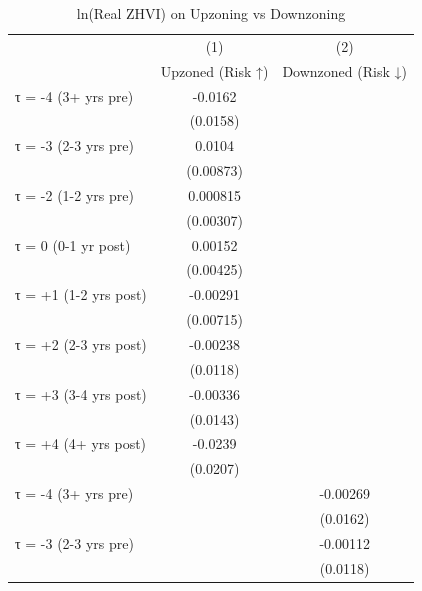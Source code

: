 \begin{table}[htbp]\centering
\def\sym#1{\ifmmode^{#1}\else\(^{#1}\)\fi}
\caption{ln(Real ZHVI) on Upzoning vs Downzoning}
\begin{tabular}{l*{2}{c}}
\hline\hline
                    &\multicolumn{1}{c}{(1)}&\multicolumn{1}{c}{(2)}\\
                    &\multicolumn{1}{c}{Upzoned (Risk ↑)}&\multicolumn{1}{c}{Downzoned (Risk ↓)}\\
\hline
τ = -4 (3+ yrs pre) &     -0.0162         &                     \\
                    &    (0.0158)         &                     \\
[1em]
τ = -3 (2-3 yrs pre)&      0.0104         &                     \\
                    &   (0.00873)         &                     \\
[1em]
τ = -2 (1-2 yrs pre)&    0.000815         &                     \\
                    &   (0.00307)         &                     \\
[1em]
τ = 0 (0-1 yr post) &     0.00152         &                     \\
                    &   (0.00425)         &                     \\
[1em]
τ = +1 (1-2 yrs post)&    -0.00291         &                     \\
                    &   (0.00715)         &                     \\
[1em]
τ = +2 (2-3 yrs post)&    -0.00238         &                     \\
                    &    (0.0118)         &                     \\
[1em]
τ = +3 (3-4 yrs post)&    -0.00336         &                     \\
                    &    (0.0143)         &                     \\
[1em]
τ = +4 (4+ yrs post)&     -0.0239         &                     \\
                    &    (0.0207)         &                     \\
[1em]
τ = -4 (3+ yrs pre) &                     &    -0.00269         \\
                    &                     &    (0.0162)         \\
[1em]
τ = -3 (2-3 yrs pre)&                     &    -0.00112         \\
                    &                     &    (0.0118)         \\

\end{tabular}
\end{table}
